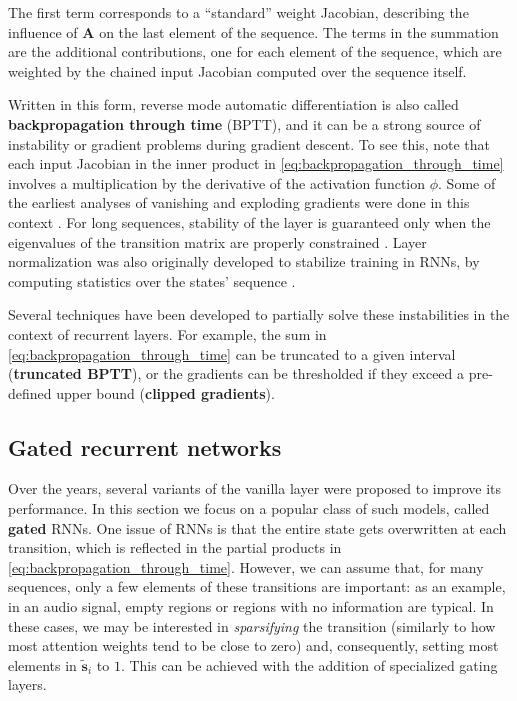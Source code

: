 The first term corresponds to a “standard” weight Jacobian, describing the influence of $\mathbf{A}$ on the last element of the sequence. The terms in the summation are the additional contributions, one for each element of the sequence, which are weighted by the chained input Jacobian computed over the sequence itself. 

Written in this form, reverse mode automatic differentiation is also called \textbf{backpropagation through time} (BPTT), and it can be a strong source of instability or gradient problems during gradient descent. To see this, note that each input Jacobian in the inner product in \eqref{eq:backpropagation_through_time} involves a multiplication by the derivative of the activation function $\phi$. Some of the earliest analyses of vanishing and exploding gradients were done in this context \cite{hochreiter1998recurrent}. For long sequences, stability of the layer is guaranteed only when the eigenvalues of the transition matrix are properly constrained \cite{gallicchio2017echo}. Layer normalization was also originally developed to stabilize training in RNNs, by computing statistics over the states’ sequence \cite{ba2016layer}.

Several techniques have been developed to partially solve these instabilities in the context of recurrent layers. For example, the sum in \eqref{eq:backpropagation_through_time} can be truncated to a given interval (\textbf{truncated BPTT}), or the gradients can be thresholded if they exceed a pre-defined upper bound (\textbf{clipped gradients}).

\subsection{Gated recurrent networks}

Over the years, several variants of the vanilla layer were proposed to improve its performance. In this section we focus on a popular class of such models, called \textbf{gated} RNNs. One issue of RNNs is that the entire state gets overwritten at each transition, which is reflected in the partial products in \eqref{eq:backpropagation_through_time}. However, we can assume that, for many sequences, only a few elements of these transitions are important: as an example, in an audio signal, empty regions or regions with no information are typical. In these cases, we may be interested in \textit{sparsifying} the transition (similarly to how most attention weights tend to be close to zero) and, consequently, setting most elements in $\widetilde{\mathbf{s}}_i$ to $1$. This can be achieved with the addition of specialized gating layers.


